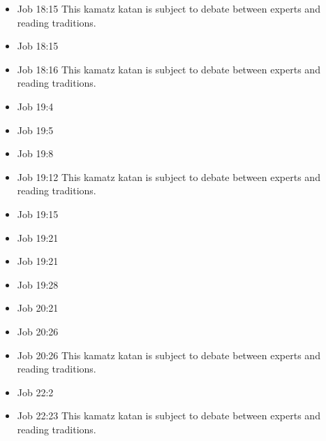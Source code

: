 \documentclass[14pt]{article}
\begin{document}
\begin{multicols}{2}
\begin{itemize}
															\item Job 18:15 This kamatz katan is subject to debate between experts and reading traditions.
															
															\item Job 18:15
															
															\item Job 18:16 This kamatz katan is subject to debate between experts and reading traditions.
															
															\item Job 19:4
															
															\item Job 19:5
															
															\item Job 19:8
															
															\item Job 19:12 This kamatz katan is subject to debate between experts and reading traditions.
															
															\item Job 19:15
															
															\item Job 19:21
															
															\item Job 19:21
															
															\item Job 19:28
															
															\item Job 20:21
															
															\item Job 20:26
															
															\item Job 20:26 This kamatz katan is subject to debate between experts and reading traditions.
															
															\item Job 22:2
															
															\item Job 22:23 This kamatz katan is subject to debate between experts and reading traditions.
															

\end{itemize}
\end{multicols}
\end{document}
